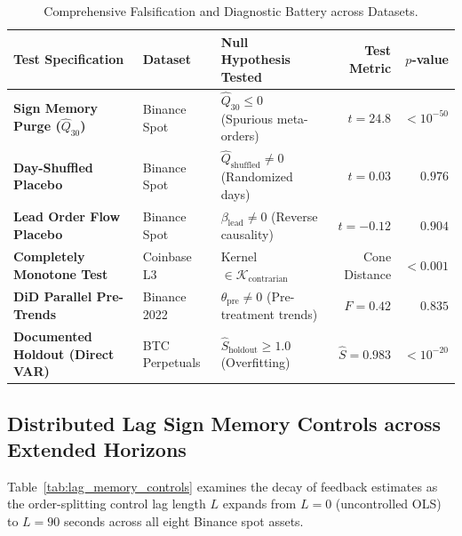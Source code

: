 \documentclass[12pt]{article}
\theoremstyle{definition}
\theoremstyle{remark}
\begin{document}
\begin{table}[htbp]
\centering\footnotesize
\setlength{\tabcolsep}{3pt}
\caption{Comprehensive Falsification and Diagnostic Battery across Datasets.}
\label{tab:falsification}
\begin{tabularx}{\textwidth}{llXrr}\toprule
Test Specification & Dataset & Null Hypothesis Tested & Test Metric & $p$-value \\\midrule
\textbf{Sign Memory Purge ($\hat{Q}_{30}$)} & Binance Spot & $\hat{Q}_{30} \le 0$ (Spurious meta-orders) & $t = 24.8$ & $< 10^{-50}$ \\
\textbf{Day-Shuffled Placebo} & Binance Spot & $\hat{Q}_{\text{shuffled}} \neq 0$ (Randomized days) & $t = 0.03$ & $0.976$ \\
\textbf{Lead Order Flow Placebo} & Binance Spot & $\beta_{\text{lead}} \neq 0$ (Reverse causality) & $t = -0.12$ & $0.904$ \\
\textbf{Completely Monotone Test} & Coinbase L3 & Kernel $\in \mathcal{K}_{\text{contrarian}}$ & Cone Distance & $< 0.001$ \\
\textbf{DiD Parallel Pre-Trends} & Binance 2022 & $\theta_{\text{pre}} \neq 0$ (Pre-treatment trends) & $F = 0.42$ & $0.835$ \\
\textbf{Documented Holdout (Direct VAR)} & BTC Perpetuals & $\hat{S}_{\text{holdout}} \ge 1.0$ (Overfitting) & $\hat{S} = 0.983$ & $< 10^{-20}$ \\\bottomrule
\end{tabularx}
\end{table}

\subsection{Distributed Lag Sign Memory Controls across Extended Horizons}
Table~\ref{tab:lag_memory_controls} examines the decay of feedback estimates as the order-splitting control lag length $L$ expands from $L=0$ (uncontrolled OLS) to $L=90$ seconds across all eight Binance spot assets.
\end{document}
